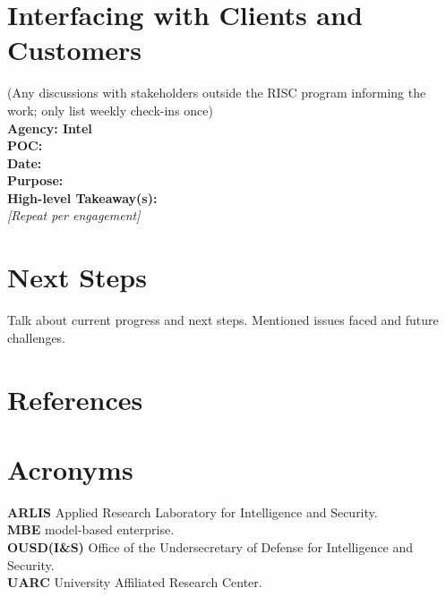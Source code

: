 \documentclass[letterpaper, 10pt]{article}
\begin{document}
\begin{multicols}{2}
    \section{Interfacing with Clients and Customers}
        (Any discussions with stakeholders outside the RISC  program informing the work; only list weekly check-ins  once) \\
        \textbf{Agency: Intel} \\  
        \textbf{POC:}  \\
        \textbf{Date:} \\
        \textbf{Purpose:} \\
        \textbf{High-level Takeaway(s):} \\ 
        \textit{[Repeat per engagement]} 

    \section{Next Steps}
        Talk about current progress and next steps. Mentioned issues faced and future challenges.
    \section{References}
        \printbibliography[heading=none]

    \section{Acronyms}
        \textbf{ARLIS} Applied Research Laboratory for Intelligence and Security.\\ 
        \textbf{MBE} model-based enterprise. \\
        \textbf{OUSD(I\&S)} Office of the Undersecretary of Defense for  Intelligence and Security. \\
        \textbf{UARC} University Affiliated Research Center.\\
    \end{multicols}
    \newpage
\end{document}
